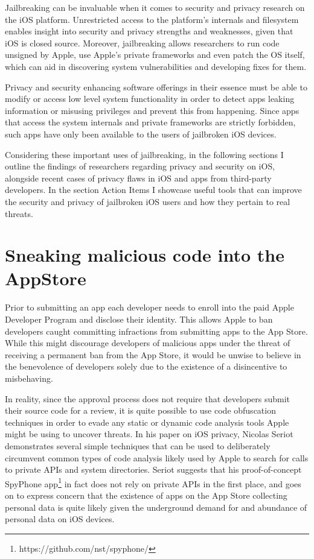 \documentclass[12pt, titlepage, oneside]{article}
\newcommand{\tab}{\hspace*{2em}}
\begin{document}
Jailbreaking can be invaluable when it comes to security and privacy research on the iOS platform. Unrestricted access to the platform's internals and filesystem enables insight into security and privacy strengths and weaknesses, given that iOS is closed source. Moreover, jailbreaking allows researchers to run code unsigned by Apple, use Apple's private frameworks and even patch the OS itself, which can aid in discovering system vulnerabilities and developing fixes for them. 

Privacy and security enhancing software offerings in their essence must be able to modify or access low level system functionality in order to detect apps leaking information or misusing privileges and prevent this from happening. Since apps that access the system internals and private frameworks are strictly forbidden, such apps have only been available to the users of jailbroken iOS devices. 

Considering these important uses of jailbreaking, in the following sections I outline the findings of researchers regarding privacy and security on iOS, alongside recent cases of privacy flaws in iOS and apps from third-party developers. In the section Action Items I showcase useful tools that can improve the security and privacy of jailbroken iOS users and how they pertain to real threats.


\section{Sneaking malicious code into the AppStore}
\tab Prior to submitting an app each developer needs to enroll into the paid Apple Developer Program and disclose their identity. This allows Apple to ban developers caught committing infractions from submitting apps to the App Store. While this might discourage developers of malicious apps under the threat of receiving a permanent ban from the App Store, it would be unwise to believe in the benevolence of developers solely due to the existence of a disincentive to misbehaving. 

In reality, since the approval process does not require that developers submit their source code for a review, it is quite possible to use code obfuscation techniques in order to evade any static or dynamic code analysis tools Apple might be using to uncover threats.  In his paper on iOS privacy\cite{priv}, Nicolas Seriot demonstrates several simple techniques that can be used to deliberately circumvent common types of code analysis likely used by Apple to search for calls to private APIs and system directories. Seriot suggests that his proof-of-concept SpyPhone app\footnote{https://github.com/nst/spyphone/} in fact does not rely on private APIs in the first place, and goes on to express concern that the existence of apps on the App Store collecting personal data is quite likely given the underground demand for and abundance of personal data on iOS devices.
\end{document}

